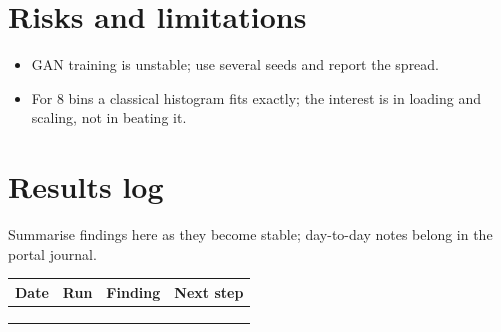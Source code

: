 \documentclass[11pt,a4paper]{article}
\begin{document}
\section{Risks and limitations}
\begin{itemize}
  \item GAN training is unstable; use several seeds and report the spread.
  \item For 8 bins a classical histogram fits exactly; the interest is in loading and scaling, not in beating it.
\end{itemize}

\section{Results log}
\label{sec:log}
Summarise findings here as they become stable; day-to-day notes belong in the portal journal.

\begin{table}[h]
\centering\small
\begin{tabularx}{\linewidth}{@{}l l >{\raggedright}X >{\raggedright\arraybackslash}X@{}}
\toprule
Date & Run & Finding & Next step \\
\midrule
 & & & \\
 & & & \\
 & & & \\
\bottomrule
\end{tabularx}
\end{table}



\end{document}
